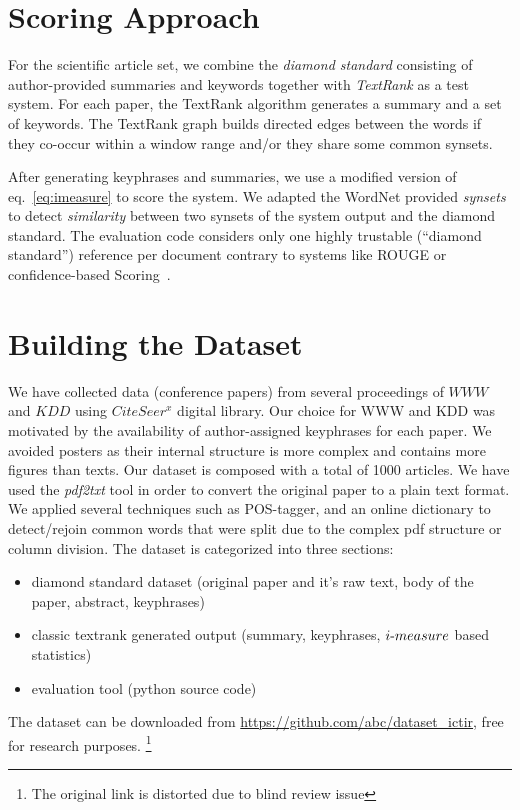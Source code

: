 \documentclass[a4paper]{report}
\begin{document}
\section{Scoring Approach}
For the scientific article set, we combine the  \emph{diamond standard} consisting of author-provided summaries and keywords together with \emph{TextRank} as a test system. For each paper, the TextRank algorithm generates a summary and a set of keywords. The TextRank graph  builds directed edges between the words if they co-occur within a window range and/or they share some common synsets.
\par After generating keyphrases and summaries, we use a modified version of eq.~\ref{eq:imeasure} to score the system. We adapted the WordNet provided \emph{synsets} to detect \emph{similarity} between two synsets of the system output and the diamond standard. 
The evaluation code considers only one highly trustable  (``diamond standard'') reference per document
contrary to systems like ROUGE or confidence-based Scoring~\cite{DBLP:conf/ecir/HamidHT16}.
\section{Building the Dataset}
We have collected data (conference papers) from several proceedings of $WWW$ and $KDD$ using $CiteSeer^{x}$ digital library. Our choice for WWW and KDD was motivated by the availability of author-assigned keyphrases for each paper. We avoided posters as their internal structure is more complex and contains more figures than texts. Our dataset is composed with a total of 1000 articles. We have used the \emph{pdf2txt} tool in order to convert the original paper to a plain text format. We applied several techniques such as POS-tagger, and an online dictionary to detect/rejoin common words that were split due to the complex pdf structure or column division.  
The dataset is categorized into three sections: 
\begin{itemize}[noitemsep, nolistsep]
\item diamond standard dataset (original paper and it's raw text, body of the paper, abstract, keyphrases)
\item classic textrank generated output (summary, keyphrases, $i\hbox{-}measure$ based statistics)
\item evaluation tool (python source code)
\end{itemize}
 The dataset can be downloaded from \url{https://github.com/abc/dataset_ictir}, free for research purposes.
 \footnote{The original link is distorted due to blind review issue}
\end{document}
